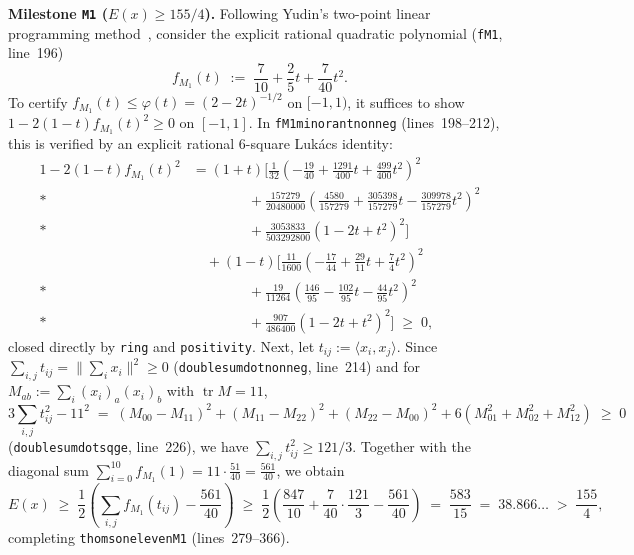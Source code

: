 \documentclass[11pt,reqno]{amsart}
\renewcommand{\_}{\origunderscore\allowbreak}
\renewcommand{\paragraph}[1]{\medskip\noindent\textbf{#1}\enspace}
\theoremstyle{definition}
\newcommand{\ip}[2]{\langle #1, #2 \rangle}
\newcommand{\norm}[1]{\lVert #1 \rVert}
\begin{document}
\paragraph{Milestone \texttt{M1} ($E(x) \ge 155/4$).}
Following Yudin's two-point linear programming method~\cite{Yudin1992}, consider the explicit rational quadratic polynomial (\texttt{fM1}, line~196)
\begin{equation}\label{eq:fM1}
  f_{M_1}(t) \;:=\; \frac{7}{10} + \frac{2}{5}t + \frac{7}{40}t^2.
\end{equation}
To certify $f_{M_1}(t) \le \varphi(t) = (2 - 2t)^{-1/2}$ on $[-1, 1)$, it suffices to show $1 - 2(1-t) f_{M_1}(t)^2 \ge 0$ on $[-1,1]$. In \texttt{fM1\_minorant\_nonneg} (lines~198--212), this is verified by an explicit rational $6$-square Luk\'acs identity:
\begin{align*}
  1 - 2(1-t) f_{M_1}(t)^2
  &= (1+t)\Biggl[
    \frac{1}{32}\!\left(-\frac{19}{40}+\frac{1291}{400}t+\frac{499}{400}t^2\right)^2 \\*
  &\qquad\qquad
    {}+ \frac{157279}{20480000}\!\left(\frac{4580}{157279}+\frac{305398}{157279}t-\frac{309978}{157279}t^2\right)^2 \\*
  &\qquad\qquad
    {}+ \frac{3053833}{503292800}(1-2t+t^2)^2
  \Biggr] \\
  &\quad + (1-t)\Biggl[
    \frac{11}{1600}\!\left(-\frac{17}{44}+\frac{29}{11}t+\frac{7}{4}t^2\right)^2 \\*
  &\qquad\qquad
    {}+ \frac{19}{11264}\!\left(\frac{146}{95}-\frac{102}{95}t-\frac{44}{95}t^2\right)^2 \\*
  &\qquad\qquad
    {}+ \frac{907}{486400}(1-2t+t^2)^2
  \Biggr] \;\ge\; 0,
\end{align*}
closed directly by \texttt{ring} and \texttt{positivity}.
Next, let $t_{ij} := \ip{x_i}{x_j}$. Since $\sum_{i,j} t_{ij} = \norm{\sum_i x_i}^2 \ge 0$ (\texttt{double\_sum\_dot\_nonneg}, line~214) and for $M_{ab} := \sum_i (x_i)_a (x_i)_b$ with $\operatorname{tr} M = 11$,
\[
  3\sum_{i,j} t_{ij}^2 - 11^2
  \;=\; (M_{00}-M_{11})^2 + (M_{11}-M_{22})^2 + (M_{22}-M_{00})^2 + 6(M_{01}^2 + M_{02}^2 + M_{12}^2) \;\ge\; 0
\]
(\texttt{double\_sum\_dot\_sq\_ge}, line~226), we have $\sum_{i,j} t_{ij}^2 \ge 121/3$.
Together with the diagonal sum $\sum_{i=0}^{10} f_{M_1}(1) = 11 \cdot \frac{51}{40} = \frac{561}{40}$, we obtain
\[
  E(x) \;\ge\; \frac{1}{2}\!\left(\sum_{i,j} f_{M_1}(t_{ij}) - \frac{561}{40}\right)
  \;\ge\; \frac{1}{2}\!\left(\frac{847}{10} + \frac{7}{40}\cdot\frac{121}{3} - \frac{561}{40}\right)
  \;=\; \frac{583}{15} \;=\; 38.866\ldots \;>\; \frac{155}{4},
\]
completing \texttt{thomson\_eleven\_M1} (lines~279--366).
\end{document}
